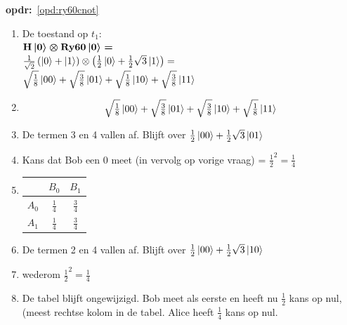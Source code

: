 \documentclass[../../main.tex]{subfiles}
\begin{document}
\textbf{opdr:}~\ref{opd:ry60cnot}%
\begin{enumerate}
\item De toestand op $t_1$:\\
$\port{H}\ket{0}\otimes\port{Ry60}\ket{0}=$\\
$\tfrac{1}{\sqrt{2}}\left(\ket{0}+\ket{1}\right)\otimes\left(\tfrac{1}{2}\ket{0}+\tfrac{1}{2}\sqrt{3}\ket{1}\right)=$\\
$\sqrt{\tfrac{1}{8}}\ket{00}+
 \sqrt{\tfrac{3}{8}}\ket{01}+
 \sqrt{\tfrac{1}{8}}\ket{10}+
 \sqrt{\tfrac{3}{8}}\ket{11}$

\item 
\[\begin{aligned}\sqrt{\tfrac{1}{8}}\ket{00}+\sqrt{\tfrac{3}{8}}\ket{01}+\sqrt{\tfrac{3}{8}}\ket{10}+\sqrt{\tfrac{1}{8}}\ket{11}\end{aligned}\]
\item De termen 3 en 4 vallen af. Blijft over $\tfrac{1}{2}\ket{00}+\tfrac{1}{2}\sqrt{3}\ket{01}$
\item Kans dat Bob een 0 meet (in vervolg op vorige vraag) = ${\tfrac{1}{2}}^2=\tfrac{1}{4}$
\item 
\begin{tabular}{|r|c|c|}
\hline
         & $B_{0}$          & $B_{1}$ \\ \hline
$A_{0}$  &   $\tfrac{1}{4}$ &  $\tfrac{3}{4}$ \\ \hline
$A_{1}$  &   $\tfrac{1}{4}$ &  $\tfrac{3}{4}$ \\ \hline
\end{tabular}
\item De termen 2 en 4 vallen af. Blijft over $\tfrac{1}{2}\ket{00}+\tfrac{1}{2}\sqrt{3}\ket{10}$
\item wederom ${\tfrac{1}{2}}^2=\tfrac{1}{4}$
\item De tabel blijft ongewijzigd. Bob meet als eerste en heeft nu $\tfrac{1}{2}$ kans op 
nul, (meest rechtse kolom in de tabel. Alice heeft $\tfrac{1}{4}$ kans op nul.
\end{enumerate}
\end{document}
